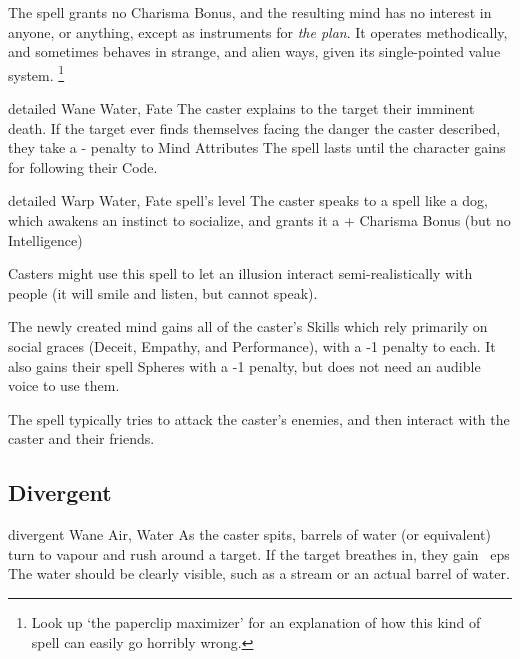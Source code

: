 \begin{multicols}{2}
{  The spell grants no Charisma Bonus, and the resulting mind has no interest in anyone, or anything, except as instruments for \emph{the plan}.
  It operates methodically, and sometimes behaves in strange, and alien ways, given its single-pointed value system.%
  \footnote{Look up `the paperclip maximizer' for an explanation of how this kind of spell can easily go horribly wrong.}
  }

\null
{}%
  {detailed}%
  {Wane}%
  {Water, Fate}%
  {}%
  {The caster explains to the target their imminent death.
    If the target ever finds themselves facing the danger the caster described, they take a - penalty to Mind Attributes}%
  {The spell lasts until the character gains  for following their Code.}



\null
{}%
  {detailed}%
  {Warp}%
  {Water, Fate}%
  {spell's level}%
  {The caster speaks to a spell like a dog, which awakens an instinct to socialize, and grants it a + Charisma Bonus (but no Intelligence)}%
  {
  Casters might use this spell to let an illusion interact semi-realistically with people (it will smile and listen, but cannot speak).

  The newly created mind gains all of the caster's Skills which rely primarily on social graces (Deceit, Empathy, and Performance), with a -1 penalty to each.
  It also gains their spell Spheres with a -1 penalty, but does not need an audible voice to use them.

  The spell typically tries to attack the caster's enemies, and then interact with the caster and their friends.

  }


\subsection{Divergent}

  {divergent}%
  {Wane}%
  {Air, Water}%
  {}%
  {As the caster spits,  barrels of water (or equivalent) turn to vapour and rush around a target.
  If the target breathes in, they gain ~\glspl{ep}}%
  {
    The water should be clearly visible, such as a stream or an actual barrel of water.}


\end{multicols}
